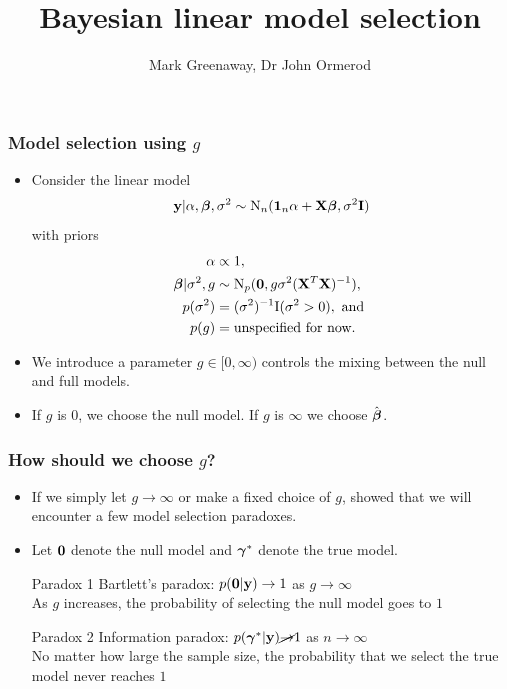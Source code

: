 \documentclass{beamer}
\title{Bayesian linear model selection}
\author{Mark Greenaway, Dr John Ormerod}
\begin{document}
\begin{frame}
	\titlepage
\end{frame}
			
\begin{frame}
	\frametitle{Model selection using $g$}
	\begin{itemize}
		\item Consider the linear model
		\begin{align*}
			{\bf y} | \alpha, {\boldsymbol \beta}, \sigma^2 \sim \text{N}_n({\bf 1}_n \alpha + {\bf X} {\boldsymbol \beta}, \sigma^2 {\bf I}) 
		\end{align*}
		with priors
		\begin{align*}
			\alpha & \propto 1, \\
			{\boldsymbol \beta} | \sigma^2, g & \sim \text{N}_p({\bf 0}, g \sigma^2 ({\bf X}^T {\bf X})^{-1}),                     \\
			p(\sigma^2)          & = (\sigma^2)^{-1} \text{I}(\sigma^2 > 0), \text{ and }                    \\
			p(g)                 & = \text{unspecified for now}.
		\end{align*}
		\item We introduce a parameter $g \in [0, \infty)$ controls the mixing between the null and full models.
		\item If $g$ is $0$, we
		choose the null model. If $g$ is $\infty$ we choose $\hat{{\boldsymbol \beta}}$.
	\end{itemize}
\end{frame}

\begin{frame}
	\frametitle{How should we choose $g$?}

	\begin{itemize}
		\item If we simply let $g \to \infty$ or make a fixed choice of $g$, \citep{Liang2008} showed that we will
		encounter a few model selection paradoxes.
		\item Let ${\bf 0}$ denote the null model and ${\boldsymbol \gamma}^*$ denote the true model.

		\setlength{\itemindent}{4.8em}
		\item[Paradox 1] Bartlett's paradox: $p({\bf 0} | {\bf y}) \to 1$ as $g \to \infty$ \\
					As $g$ increases, the probability of selecting the null model goes to $1$
		\item[Paradox 2] Information paradox: $p({\boldsymbol \gamma}^* | {\bf y}) \cancel{\to} 1$ as $n \to \infty$ \\
					No matter how large the sample size, the probability that we select the true model never
					reaches $1$
	\end{itemize}

\end{frame}
\end{document}
